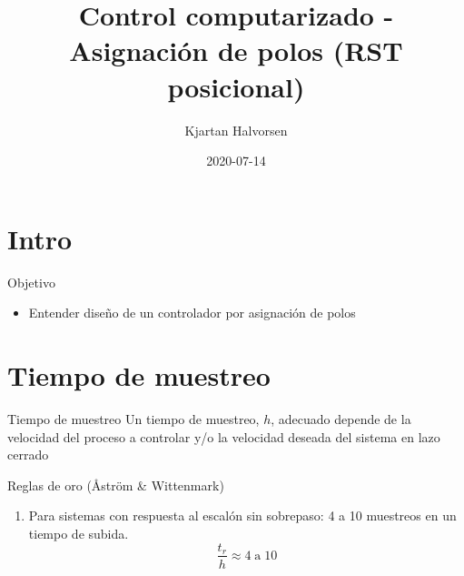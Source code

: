 \documentclass[presentation,aspectratio=169]{beamer}
\author{Kjartan Halvorsen}
\date{2020-07-14}
\title{Control computarizado - Asignación de polos (RST posicional)}
\begin{document}
\maketitle

\section{Intro}
\label{sec:org51742be}

\begin{frame}[label={sec:orgbd62c1c}]{Objetivo}
\begin{itemize}
\item Entender diseño de un controlador por asignación de polos
\end{itemize}
\end{frame}

\section{Tiempo de muestreo}
\label{sec:orgab39695}
\begin{frame}[label={sec:org1a3325b}]{Tiempo de muestreo}
\alert{Un tiempo de muestreo, \(h\), adecuado depende de la velocidad del proceso a controlar y/o la velocidad deseada del sistema en lazo cerrado}  
\begin{block}{Reglas de oro (Åström \& Wittenmark)}
\begin{enumerate}
\item Para sistemas con respuesta al escalón \alert{sin} sobrepaso: \alert{4 a 10} muestreos en un tiempo de subida. \[ \frac{t_r}{h} \approx 4 \; \text{a} \; 10 \]
\begin{center}
\def\TT{1}
\pgfmathsetmacro{\hh}{\TT/6}
\end{center}
\end{enumerate}
\end{block}
\end{frame}
\end{document}

